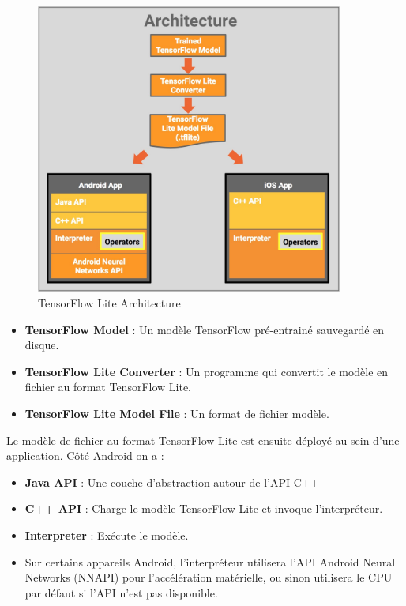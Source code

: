 \documentclass[CDS,UTF8,final]{EPURapport}
\begin{document}
\begin{figure}[h!]
  \centering
  \includegraphics[width=0.9\textwidth]{images/Tflite_architecture.jpg}
  \caption{TensorFlow Lite Architecture}
  \label{fig:tfliteArchitecture}
\end{figure}

\newpage

\begin{itemize}

\item \textbf{TensorFlow Model} : Un modèle TensorFlow pré-entrainé sauvegardé en disque.
\item \textbf{TensorFlow Lite Converter} : Un programme qui convertit le modèle en fichier au format TensorFlow Lite.
\item \textbf{TensorFlow Lite Model File} : Un format de fichier modèle.

\end{itemize}

Le modèle de fichier au format TensorFlow Lite est ensuite déployé au sein d'une application. Côté Android on a :

\begin{itemize}

\item \textbf{Java API} : Une couche d'abstraction autour de l'API C++
\item \textbf{C++ API} : Charge le modèle TensorFlow Lite et invoque l'interpréteur.
\item \textbf{Interpreter} : Exécute le modèle.
\item Sur certains appareils Android, l'interpréteur utilisera l'API Android Neural Networks (NNAPI) pour l'accélération matérielle, ou sinon utilisera le CPU par défaut si l'API n'est pas disponible.

\end{itemize}
\end{document}

